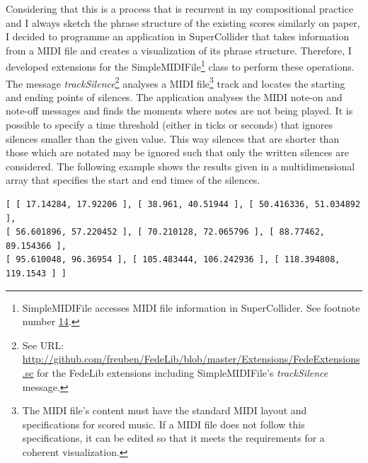 Considering that this is a process that is recurrent in my compositional practice and I always sketch the phrase structure of the existing scores similarly on paper, I decided to programme an application in SuperCollider that takes information from a MIDI file and creates a visualization of its phrase structure. Therefore, I developed extensions for the SimpleMIDIFile\footnote{SimpleMIDIFile accesses MIDI file information in SuperCollider. See footnote number \hyperlink{wlib}{14}.} class to perform these operations. The message \emph{trackSilence}\footnote{See URL: \href{http://github.com/freuben/FedeLib/blob/master/Extensions/FedeExtensions.sc}{http://github.com/freuben/FedeLib/blob/master/Extensions/FedeExtensions.sc} for the FedeLib extensions including SimpleMIDIFile's \emph{trackSilence} message.} analyses a MIDI file\footnote{The MIDI file's content must have the standard MIDI layout and specifications for scored music. If a MIDI file does not follow this specifications, it can be edited so that it meets the requirements for a coherent visualization.} track and locates the starting and ending points of silences. The application analyses the MIDI note-on and note-off messages and finds the moments where notes are not being played. It is possible to specify a time threshold (either in ticks or seconds) that ignores silences smaller than the given value. This way silences that are shorter than those which are notated may be ignored such that only the written silences are considered. The following example shows  the results given in a multidimensional array that specifies the start and end times of the silences.
\begin{verbatim}
[ [ 17.14284, 17.92206 ], [ 38.961, 40.51944 ], [ 50.416336, 51.034892 ], 
[ 56.601896, 57.220452 ], [ 70.210128, 72.065796 ], [ 88.77462, 89.154366 ], 
[ 95.610048, 96.36954 ], [ 105.483444, 106.242936 ], [ 118.394808, 119.1543 ] ]
\end{verbatim}

